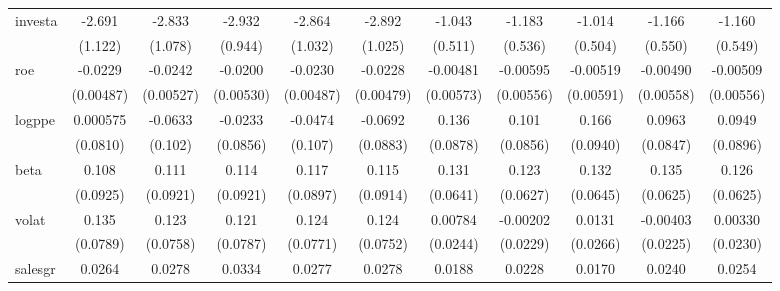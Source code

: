 \begin{table}[htbp]
\begin{tabular}{l*{10}{c}}
investa         &   -2.691\sym{**} &   -2.833\sym{**} &   -2.932\sym{***}&   -2.864\sym{***}&   -2.892\sym{***}&   -1.043\sym{**} &   -1.183\sym{**} &   -1.014\sym{**} &   -1.166\sym{**} &   -1.160\sym{**} \\
                &  (1.122)         &  (1.078)         &  (0.944)         &  (1.032)         &  (1.025)         &  (0.511)         &  (0.536)         &  (0.504)         &  (0.550)         &  (0.549)         \\
roe             &  -0.0229\sym{***}&  -0.0242\sym{***}&  -0.0200\sym{***}&  -0.0230\sym{***}&  -0.0228\sym{***}& -0.00481         & -0.00595         & -0.00519         & -0.00490         & -0.00509         \\
                &(0.00487)         &(0.00527)         &(0.00530)         &(0.00487)         &(0.00479)         &(0.00573)         &(0.00556)         &(0.00591)         &(0.00558)         &(0.00556)         \\
logppe          & 0.000575         &  -0.0633         &  -0.0233         &  -0.0474         &  -0.0692         &    0.136         &    0.101         &    0.166\sym{*}  &   0.0963         &   0.0949         \\
                & (0.0810)         &  (0.102)         & (0.0856)         &  (0.107)         & (0.0883)         & (0.0878)         & (0.0856)         & (0.0940)         & (0.0847)         & (0.0896)         \\
beta            &    0.108         &    0.111         &    0.114         &    0.117         &    0.115         &    0.131\sym{**} &    0.123\sym{*}  &    0.132\sym{**} &    0.135\sym{**} &    0.126\sym{**} \\
                & (0.0925)         & (0.0921)         & (0.0921)         & (0.0897)         & (0.0914)         & (0.0641)         & (0.0627)         & (0.0645)         & (0.0625)         & (0.0625)         \\
volat           &    0.135\sym{*}  &    0.123         &    0.121         &    0.124         &    0.124         &  0.00784         & -0.00202         &   0.0131         & -0.00403         &  0.00330         \\
                & (0.0789)         & (0.0758)         & (0.0787)         & (0.0771)         & (0.0752)         & (0.0244)         & (0.0229)         & (0.0266)         & (0.0225)         & (0.0230)         \\
salesgr         &   0.0264         &   0.0278         &   0.0334         &   0.0277         &   0.0278         &   0.0188         &   0.0228         &   0.0170         &   0.0240         &   0.0254         \\

\end{tabular}
\end{table}

